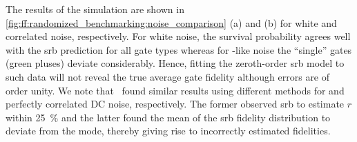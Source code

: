 The results of the simulation are shown in \cref{fig:ff:randomized_benchmarking:noise_comparison} (a) and (b) for white and correlated noise, respectively.
For white noise, the survival probability agrees well with the \gls{srb} prediction for all gate types whereas for \oneoverf-like noise the \enquote{single} gates (green pluses) deviate considerably.
Hence, fitting the zeroth-order \gls{srb} model to such data will not reveal the true average gate fidelity although errors are of order unity.
We note that~ found similar results using different methods for \oneoverf and perfectly correlated DC noise, respectively.
The former observed \gls{srb} to estimate $r$ within \qty{25}{\percent} and the latter found the mean of the \gls{srb} fidelity distribution to deviate from the mode, thereby giving rise to incorrectly estimated fidelities.

